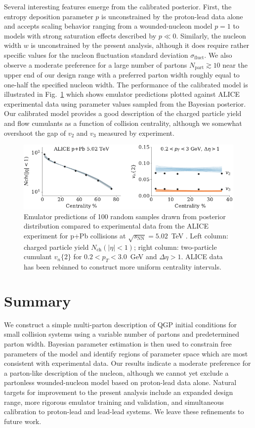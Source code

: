 \documentclass[3p,times,procedia]{elsarticle}
\begin{document}
Several interesting features emerge from the calibrated posterior.
First, the entropy deposition parameter $p$ is unconstrained by the proton-lead data alone and accepts scaling behavior ranging from a wounded-nucleon model $p=1$ to models with strong saturation effects described by $p \ll 0$.
Similarly, the nucleon width $w$ is unconstrained by the present analysis, although it does require rather specific values for the nucleon fluctuation standard deviation $\sigma_\mathrm{fluct}$.
We also observe a moderate preference for a large number of partons $N_\mathrm{part} \gtrsim 10$ near the upper end of our design range with a preferred parton width roughly equal to one-half the specified nucleon width.
The performance of the calibrated model is illustrated in Fig.~\ref{fig:observables} which shows emulator predictions plotted against ALICE experimental data \cite{Abelev:2014mda} using parameter values sampled from the Bayesian posterior.
Our calibrated model provides a good description of the charged particle yield and flow cumulants as a function of collision centrality, although we somewhat overshoot the gap of $v_2$ and $v_3$ measured by experiment.
\begin{figure}
  \centering
  \includegraphics{observables_samples}
  \caption{
    \label{fig:observables} Emulator predictions of 100 random samples drawn from posterior distribution compared to experimental data from the ALICE experiment for p+Pb collisions at $\sqrt{s_\mathrm{NN}} = 5.02$~TeV \cite{Abelev:2014mda}.
    Left column: charged particle yield $N_\mathrm{ch}(|\eta| < 1)$; right column: two-particle cumulant $v_n\{2\}$ for $0.2 < p_T < 3.0$~GeV and $\Delta \eta > 1$. ALICE data has been rebinned to construct more uniform centrality intervals.
  }
\end{figure}

\section{Summary}
We construct a simple multi-parton description of QGP initial conditions for small collision systems using a variable number of partons and predetermined parton width.
Bayesian parameter estimation is then used to constrain free parameters of the model and identify regions of parameter space which are most consistent with experimental data.
Our results indicate a moderate preference for a parton-like description of the nucleon, although we cannot yet exclude a partonless wounded-nucleon model based on proton-lead data alone.
Natural targets for improvement to the present analysis include an expanded design range, more rigorous emulator training and validation, and simultaneous calibration to proton-lead and lead-lead systems.
We leave these refinements to future work.
\end{document}
